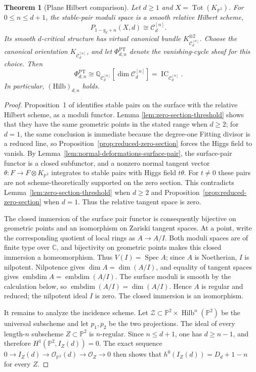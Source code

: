 \documentclass[11pt,reqno]{amsart}
\newtheorem{theorem}{Theorem}[section]
\theoremstyle{definition}
\newcommand{\C}{\mathbb C}
\newcommand{\Q}{\mathbb Q}
\newcommand{\Pp}{\mathbb P}
\newcommand{\Ocal}{\mathcal O}
\newcommand{\IC}{\operatorname{IC}}
\newcommand{\Hilb}{\operatorname{Hilb}}
\newcommand{\Tot}{\operatorname{Tot}}
\newcommand{\PT}{\operatorname{PT}}
\begin{document}
\begin{theorem}[Plane Hilbert comparison]\label{thm:plane-smooth-range}
Let $d\ge1$ and $X=\Tot(K_{\Pp^2})$.  For $0\le n\le d+1$, the stable-pair moduli
space is a smooth relative Hilbert scheme,
\[
  P_{1-g_d+n}(X,d)\cong\mathcal C_d^{[n]}.
\]
Its smooth $d$-critical structure has virtual canonical bundle
$K_{\mathcal C_d^{[n]}}^{\otimes2}$.  Choose the canonical orientation
$K_{\mathcal C_d^{[n]}}$, and let $\Phi_{d,n}^{\PT}$ denote the
vanishing-cycle sheaf for this choice.  Then
\[
  \Phi_{d,n}^{\PT}
  \cong\Q_{\mathcal C_d^{[n]}}[\dim\mathcal C_d^{[n]}]
  =\IC_{\mathcal C_d^{[n]}}.
\]
In particular, $(\mathrm{Hilb})_{d,n}$ holds.
\end{theorem}

\begin{proof}
Proposition~1 of \cite{CKK} identifies stable pairs on the surface with the
relative Hilbert scheme, as a moduli functor.  Lemma
\ref{lem:zero-section-threshold} shows that they have the same geometric
points in the stated range when $d\ge2$; for $d=1$, the same conclusion is
immediate because the degree-one Fitting divisor is a reduced line, so
Proposition~\ref{prop:reduced-zero-section} forces the Higgs field to
vanish.  By
Lemma~\ref{lem:normal-deformations-surface-pair}, the surface-pair functor is
a closed subfunctor, and a nonzero normal tangent vector
$\theta:F\to F\otimes K_{\Pp^2}$ integrates to stable pairs with Higgs field
$t\theta$.  For $t\ne0$ these pairs are not scheme-theoretically supported
on the zero section.  This contradicts
Lemma~\ref{lem:zero-section-threshold} when $d\ge2$ and
Proposition~\ref{prop:reduced-zero-section} when $d=1$.
Thus the relative tangent space is zero.

The closed immersion of the surface pair functor is consequently bijective
on geometric points and an isomorphism on Zariski tangent spaces.  At a
point, write the corresponding quotient of local rings as $A\to A/I$.
Both moduli spaces are of finite type over $\C$, and bijectivity on
geometric points makes this closed immersion a homeomorphism.  Thus
$V(I)=\operatorname{Spec}A$; since $A$ is Noetherian, $I$ is nilpotent.
Nilpotence gives $\dim A=\dim(A/I)$, and equality of tangent spaces gives
$\operatorname{embdim}A=\operatorname{embdim}(A/I)$.  The surface moduli is
smooth by the calculation below, so
$\operatorname{embdim}(A/I)=\dim(A/I)$.  Hence $A$ is regular and reduced;
the nilpotent ideal $I$ is zero.  The closed immersion is an isomorphism.

It remains to analyze the incidence scheme.  Let
$\mathcal Z\subset\Pp^2\times\Hilb^n(\Pp^2)$ be the universal
subscheme and let $p_1,p_2$ be the two projections.  The ideal of every
length-$n$ subscheme $Z\subset\Pp^2$ is $n$-regular.  Since $n\le d+1$, one
has $d\ge n-1$, and therefore
$H^1(\Pp^2,I_Z(d))=0$.  The exact sequence
$0\to I_Z(d)\to\Ocal_{\Pp^2}(d)\to\Ocal_Z\to0$ then shows that
$h^0(I_Z(d))=D_d+1-n$ for every $Z$.


\end{proof}
\end{document}
